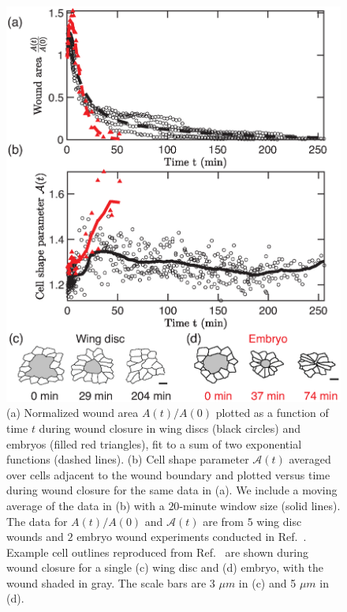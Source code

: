 \documentclass[%
 reprint,
superscriptaddress,
amsmath,amssymb,
prl,
floatfix,
]{revtex4-2}
\begin{document}
\begin{figure}[!t]
    \centering
    \includegraphics[width=\linewidth]{Fig1.eps}
\caption{(a) Normalized wound area $A(t)/A(0)$ plotted as a function of time $t$ during wound closure in wing discs (black circles) and embryos (filled red triangles), fit to a sum of two exponential functions (dashed lines). (b) Cell shape parameter $\mathcal{A}(t)$ averaged over cells adjacent to the wound boundary and plotted versus time during wound closure for the same data in (a). We include a moving average of the data in (b) with a $20$-minute window size (solid lines). The data for $A(t)/A(0)$ and $\mathcal{A}(t)$ are from $5$ wing disc wounds and $2$ embryo wound experiments conducted in Ref.~\cite{tetley2019tissue}. Example cell outlines reproduced from Ref.~\cite{tetley2019tissue} are shown during wound closure for a single (c) wing disc and (d) embryo, with the wound shaded in gray. The scale bars are 3 $\mu m$ in (c) and 5 $\mu m$ in (d). 
}
\label{fig:experimentalObservations}
\end{figure}
\end{document}
